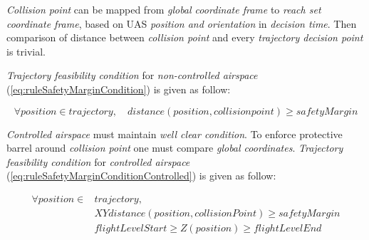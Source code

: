     \emph{Collision point} can be mapped from \emph{global coordinate frame} to \emph{reach set coordinate frame}, based on UAS \emph{position and orientation} in \emph{decision time}. Then comparison of distance between \emph{collision point} and every \emph{trajectory decision point} is trivial. 
    
    \emph{Trajectory feasibility condition}  for \emph{non-controlled airspace} (\ref{eq:ruleSafetyMarginCondition}) is given as follow:
    
    \begin{equation}\label{eq:ruleSafetyMarginCondition}
        \forall position \in trajectory, \quad distance(position,collision point) \ge safetyMargin
    \end{equation}
    
    \noindent\emph{Controlled airspace} must maintain \emph{well clear condition}. To enforce protective barrel around \emph{collision point} one must compare \emph{global coordinates}.
    \emph{Trajectory feasibility condition}  for \emph{controlled airspace} (\ref{eq:ruleSafetyMarginConditionControlled}) is given as follow:
    
    \begin{equation}\label{eq:ruleSafetyMarginConditionControlled}
        \begin{aligned}
            \forall position \in &trajectory,\\
            &XYdistance(position,collisionPoint) \ge safetyMargin\\
            &flightLevelStart \ge Z(position) \ge flightLevelEnd
        \end{aligned}
    \end{equation}
    
